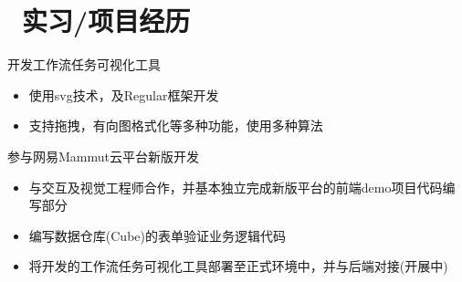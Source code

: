 \documentclass{resume}
\begin{document}
\section{\faUsers\ 实习/项目经历}
\begin{onehalfspacing}
开发工作流任务可视化工具
\begin{itemize}
  \item 使用svg技术，及Regular框架开发
  \item 支持拖拽，有向图格式化等多种功能，使用多种算法
\end{itemize}
\end{onehalfspacing}
\begin{onehalfspacing}
参与网易Mammut云平台新版开发
\begin{itemize}
  \item 与交互及视觉工程师合作，并基本独立完成新版平台的前端demo项目代码编写部分
  \item 编写数据仓库(Cube)的表单验证业务逻辑代码
  \item 将开发的工作流任务可视化工具部署至正式环境中，并与后端对接(开展中)
\end{itemize}
\end{onehalfspacing}
\end{document}
